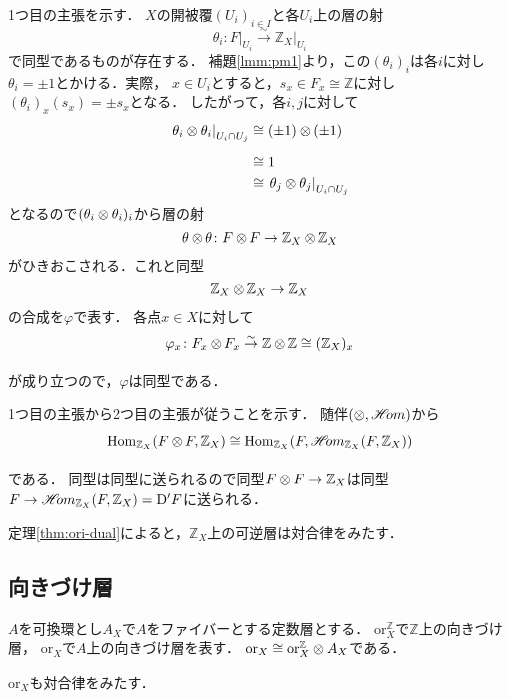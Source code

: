 \documentclass[uplatex,dvipdfmx,a4paper,10pt]{jsarticle}
\makeatletter
\theoremstyle{definition}
\newcommand{\ZZ}{\mathbb{Z}}
\newcommand{\Hom}{\mathop{\mathrm{Hom}}\nolimits} %
\renewenvironment{proof}[1][\proofname]{\par
  \pushQED{\qed}%
  \normalfont \topsep6\p@\@plus6\p@\relax
  \trivlist
  \item[\hskip\labelsep
         \bfseries
    {#1}]\ignorespaces
}{%
  \popQED\endtrivlist\@endpefalse
}
\renewcommand{\proofname}{証明.}
\numberwithin{equation}{section}
\newcommand{\HOM}{\mathop{\mathscr{H}\hspace{-2pt}om}\nolimits}%
\newcommand{\simar}{\mathrel{\overset{\sim}{\rightarrow}}}%
\newcommand{\rmD}{\mathrm{D}}
\newcommand{\ori}{\mathord{\mathrm{or}}}
\newcommand{\tens}[1][]{\mathbin{\otimes_{\raise1.5ex\hbox to-.1em{}{#1}}}}
\newcommand{\ttens}[1][]{\mathbin{\mathop{\overset{\mathrm{}}{\tens}}_{#1}}}
\newcommand{\mres}[2][]{{\left.{#1}\right\rvert}_{#2}}
\theoremstyle{mystyle}
\makeatother
\begin{document}
\begin{proof}[{定理\ref{thm:ori-dual}の証明}]
    1つ目の主張を示す．
    \(X\)の開被覆\((U_i)_{i\in I}\)と各\(U_i\)上の層の射
    \[
        \theta_i\colon\mres[F]{U_{i}}\simar\mres[\ZZ_X]{U_{i}}
    \]で同型であるものが存在する．
    補題\ref{lmm:pm1}より，この\((\theta_i)_{i}\)は各\(i\)に対し
    \(\theta_i=\pm1\)とかける．実際，
    \(x\in U_i\)とすると，\(s_x\in F_x\cong\ZZ\)に対し\(
        (\theta_{i})_x(s_x)=\pm{s_x}
    \)となる．
    したがって，各\(i,j\)に対して    
    \begin{align*}
        \mres[\theta_{i}\otimes\theta_{i}]{{U_{i}\cap U_{j}}}
        &\cong
        (\pm1)\ttens[](\pm1)\\
        &\cong
        1\\
        &\cong
        \mres[\theta_{j}\otimes\theta_{j}]{{U_{i}\cap U_{j}}}
    \end{align*}
    となるので\((\theta_i\ttens[]\theta_i)_i\)から層の射
    \[
        \theta\tens[]\theta\colon F\tens[]F
        \to\ZZ_X\tens[]\ZZ_X
    \]
    がひきおこされる．これと同型
    \[
        \ZZ_X\tens[]\ZZ_X\to\ZZ_X
    \]
    の合成を\(\varphi\)で表す．
    各点\(x\in X\)に対して
    \[
        \varphi_x\colon F_x\ttens[]F_x\simar\ZZ\ttens[]\ZZ\cong(\ZZ_{X})_x
    \]が成り立つので，\(\varphi\)は同型である．

    1つ目の主張から2つ目の主張が従うことを示す．
    随伴\((\ttens[],\HOM)\)から
    \begin{align*}
        \Hom_{\ZZ_X}(F\ttens[]F,\ZZ_X)
        \cong
        \Hom_{\ZZ_X}(F,\HOM_{\ZZ_X}(F,\ZZ_X))
    \end{align*}
    である．
    同型は同型に送られるので同型\(
        F\ttens[]F\to \ZZ_X
    \)は同型\(F\to\HOM_{\ZZ_X}(F,\ZZ_X)=\rmD'F\)に送られる．
\end{proof}

定理\ref{thm:ori-dual}によると，\(\ZZ_X\)上の可逆層は対合律をみたす．
\subsection{向きづけ層}

\(A\)を可換環とし\(A_X\)で\(A\)をファイバーとする定数層とする．
\(\ori_{X}^{\ZZ}\)で\(\ZZ\)上の向きづけ層，
\(\ori_X\)で\(A\)上の向きづけ層を表す．
\(\ori_X\cong\ori^{\ZZ}_{X}\ttens[]A_X\)である．

\(\ori_X\)も対合律をみたす．
\end{document}
